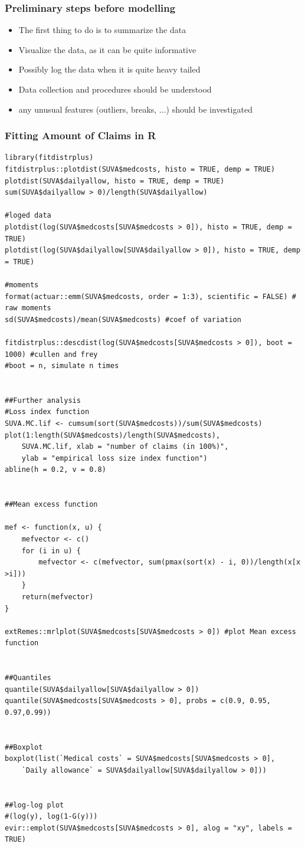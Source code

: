 \documentclass{article}
\begin{document}
\subsubsection{Preliminary steps before modelling}

\begin{itemize}
    \item The first thing to do is to summarize the data
    \item Visualize the data, as it can be quite informative
    \item Possibly log the data when it is quite heavy tailed
    \item Data collection and procedures should be understood
    \item any unusual features (outliers, breaks, ...) should be investigated
\end{itemize}


\subsubsection{Fitting Amount of Claims in R}
\begin{lstlisting}
library(fitdistrplus)
fitdistrplus::plotdist(SUVA$medcosts, histo = TRUE, demp = TRUE)
plotdist(SUVA$dailyallow, histo = TRUE, demp = TRUE)
sum(SUVA$dailyallow > 0)/length(SUVA$dailyallow)

#loged data
plotdist(log(SUVA$medcosts[SUVA$medcosts > 0]), histo = TRUE, demp = TRUE)
plotdist(log(SUVA$dailyallow[SUVA$dailyallow > 0]), histo = TRUE, demp = TRUE)

#moments
format(actuar::emm(SUVA$medcosts, order = 1:3), scientific = FALSE) # raw moments
sd(SUVA$medcosts)/mean(SUVA$medcosts) #coef of variation

fitdistrplus::descdist(log(SUVA$medcosts[SUVA$medcosts > 0]), boot = 1000) #cullen and frey
#boot = n, simulate n times


##Further analysis
#Loss index function
SUVA.MC.lif <- cumsum(sort(SUVA$medcosts))/sum(SUVA$medcosts)
plot(1:length(SUVA$medcosts)/length(SUVA$medcosts),
    SUVA.MC.lif, xlab = "number of claims (in 100%)", 
    ylab = "empirical loss size index function")
abline(h = 0.2, v = 0.8)


##Mean excess function

mef <- function(x, u) {
    mefvector <- c()
    for (i in u) {
        mefvector <- c(mefvector, sum(pmax(sort(x) - i, 0))/length(x[x >i]))
    }
    return(mefvector)
}

extRemes::mrlplot(SUVA$medcosts[SUVA$medcosts > 0]) #plot Mean excess function


##Quantiles
quantile(SUVA$dailyallow[SUVA$dailyallow > 0])
quantile(SUVA$medcosts[SUVA$medcosts > 0], probs = c(0.9, 0.95, 0.97,0.99))


##Boxplot
boxplot(list(`Medical costs` = SUVA$medcosts[SUVA$medcosts > 0],
    `Daily allowance` = SUVA$dailyallow[SUVA$dailyallow > 0]))


##log-log plot
#(log(y), log(1-G(y)))
evir::emplot(SUVA$medcosts[SUVA$medcosts > 0], alog = "xy", labels = TRUE)
\end{lstlisting}
\end{document}
